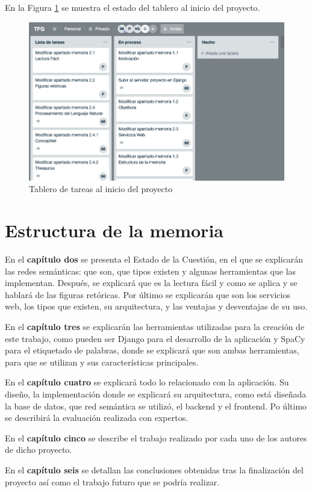 En la Figura \ref{fig:trello} se muestra el estado del tablero al inicio del proyecto.
\begin{figure}[!h]
	\includegraphics[width=1.0\textwidth]{Imagenes/Bitmap/Capitulo1/trello.png}
	\caption{Tablero de tareas al inicio del proyecto}
	\label{fig:trello}
\end{figure}


\section{Estructura de la memoria}
\label{cap:sec:estructuramemoria}


En el \textbf{capítulo dos} se presenta el Estado de la Cuestión, en el que se explicarán las redes semánticas: que son, que tipos existen y algunas herramientas que las implementan. Después, se explicará que es la lectura fácil y como se aplica y se hablará de las figuras retóricas. Por último se explicarán que son los servicios web, los tipos que existen, su arquitectura, y las ventajas y desventajas de su uso.

En el \textbf{capítulo tres} se explicarán las herramientas utilizadas para la creación de este trabajo, como pueden ser Django para el desarrollo de la aplicación y SpaCy para el etiquetado de palabras, donde se explicará que son ambas herramientas, para que se utilizan y sus características principales.

En el \textbf{capítulo cuatro} se explicará todo lo relacionado con la aplicación. Su diseño, la implementación donde se explicará su arquitectura, como está diseñada la base de datos, que red semántica se utilizó, el backend y el frontend. Po último se describirá la evaluación realizada con expertos.

 
En el \textbf{capítulo cinco} se describe el trabajo realizado por cada uno de los autores de dicho proyecto.

En el \textbf{capítulo seis} se detallan las conclusiones obtenidas tras la finalización del proyecto así como el trabajo futuro que se podría realizar.